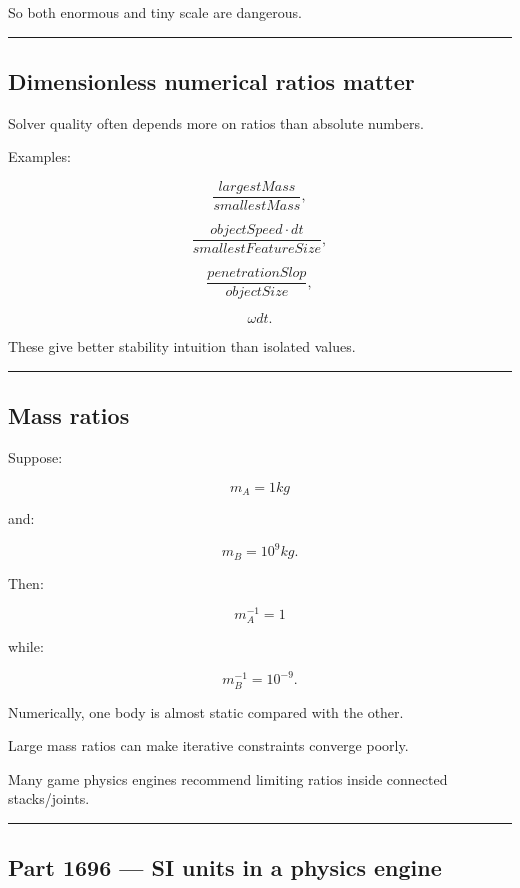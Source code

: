 So both enormous and tiny scale are dangerous.

\begin{center}\rule{0.5\linewidth}{0.5pt}\end{center}

\subsection{Dimensionless numerical ratios matter}\label{06-engine-ii-ch039-dimensionless-numerical-ratios-matter}

Solver quality often depends more on ratios than absolute numbers.

Examples:

\[
\frac{largestMass}{smallestMass},
\]

\[
\frac{objectSpeed\cdot dt}{smallestFeatureSize},
\]

\[
\frac{penetrationSlop}{objectSize},
\]

\[
\omega dt.
\]

These give better stability intuition than isolated values.

\begin{center}\rule{0.5\linewidth}{0.5pt}\end{center}

\subsection{Mass ratios}\label{06-engine-ii-ch039-mass-ratios}

Suppose:

\[
m_A=1kg
\]

and:

\[
m_B=10^9kg.
\]

Then:

\[
m_A^{-1}=1
\]

while:

\[
m_B^{-1}=10^{-9}.
\]

Numerically, one body is almost static compared with the other.

Large mass ratios can make iterative constraints converge poorly.

Many game physics engines recommend limiting ratios inside connected stacks/joints.

\begin{center}\rule{0.5\linewidth}{0.5pt}\end{center}

\subsection{Part 1696 --- SI units in a physics engine}\label{06-engine-ii-ch039-part-1696-si-units-in-a-physics-engine}

